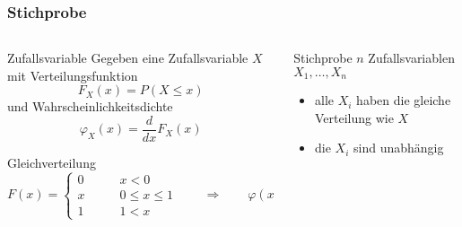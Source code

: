%
%
%
\bgroup
\begin{frame}[t]
\setlength{\abovedisplayskip}{5pt}
\setlength{\belowdisplayskip}{5pt}
\frametitle{Stichprobe}
\vspace{-20pt}
\begin{columns}[t,onlytextwidth]
\begin{column}{0.48\textwidth}
\begin{block}{Zufallsvariable}
Gegeben eine Zufallsvariable $X$ mit
Verteilungsfunktion
\[
F_X(x)
=
P(X\le x)
\]
und
Wahrscheinlichkeitsdichte
\[
\varphi_X(x)
=
\frac{d}{dx} F_X(x)
\]
\end{block}
\begin{block}{Gleichverteilung}
\[
F(x) = \begin{cases}
0&\qquad x<0\\
x&\qquad 0\le x \le 1\\
1&\qquad 1<x
\end{cases}
\qquad\Rightarrow\qquad
\varphi(x)
=
\begin{cases}
1&\qquad 0\le x \le 1\\
0&\qquad\text{sonst}.
\end{cases}
\]
\end{block}
\end{column}
\begin{column}{0.48\textwidth}
\begin{block}{Stichprobe}
$n$ Zufallsvariablen $X_1,\dots,X_n$
\begin{itemize}
\item
alle $X_i$ haben die gleiche Verteilung wie $X$
\item
die $X_i$ sind unabhängig
\end{itemize}
\end{block}
\end{column}
\end{columns}
\end{frame}
\egroup
